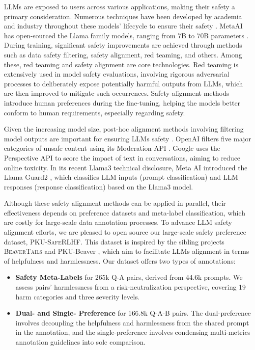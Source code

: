 \documentclass[11pt]{article}
\theoremstyle{plain}
\theoremstyle{definition}
\theoremstyle{remark}
\newcommand{\db}{\textsc{PKU-SafeRLHF}}
\begin{document}
LLMs are exposed to users across various applications, making their safety a primary consideration. 
Numerous techniques have been developed by academia and industry throughout these models' lifecycle to ensure their safety \cite{zou2023universal, dai2024safe, cheng2023black, liu2023alignbench, qi2023fine, Wang2023AllLM}.
MetaAI has open-sourced the Llama family models, ranging from 7B to 70B parameters \cite{touvron2023llama}. During training, significant safety improvements are achieved through methods such as data safety filtering, safety alignment, red teaming, and others. Among these, red teaming and safety alignment are core technologies. Red teaming \cite{zhu2023autodan,liu2023autodan,zhuo2023red,yu2023gptfuzzer} is extensively used in model safety evaluations, involving rigorous adversarial processes to deliberately expose potentially harmful outputs from LLMs, which are then improved to mitigate such occurrences. Safety alignment methods \cite{ouyang2022training, bai2022training, rafailov2024direct} introduce human preferences during the fine-tuning, helping the models better conform to human requirements, especially regarding safety.

Given the increasing model size, post-hoc alignment methods involving filtering model outputs are important for ensuring LLMs safety \cite{han2024wildguard}. OpenAI filters five major categories of unsafe content using its Moderation API \cite{openai2023moderation}. Google uses the Perspective API \cite{google2017perspective} to score the impact of text in conversations, aiming to reduce online toxicity. In its recent Llama3 technical disclosure, Meta AI introduced the Llama Guard2 \cite{llamaguard2}, which classifies LLM inputs (prompt classification) and LLM responses (response classification) based on the Llama3 model. 

Although these safety alignment methods can be applied in parallel, their effectiveness depends on preference datasets and meta-label classification, which are costly for large-scale data annotation processes. 
To advance LLM safety alignment efforts, we are pleased to open source our large-scale safety preference dataset, \db{}. This dataset is inspired by the sibling projects \textsc{BeaverTails} \cite{ji2024beavertails} and PKU-Beaver \citep{pku-beaver}, which aim to facilitate LLMs alignment in terms of helpfulness and harmlessness. Our dataset offers two types of annotations:

\begin{itemize}[left=0cm]
    \item \textbf{Safety Meta-Labels} for 265k Q-A pairs, derived from 44.6k prompts. We assess pairs' harmlessness from a risk-neutralization perspective, covering 19 harm categories and three severity levels.
    \item \textbf{Dual- and Single- Preference} for 166.8k Q-A-B pairs. The dual-preference involves decoupling the helpfulness and harmlessness from the shared prompt in the annotation, and the single-preference involves condensing multi-metrics annotation guidelines into sole comparison.
\end{itemize}
\end{document}
